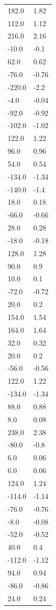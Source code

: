 \begin{longtable}{ll}
182.0 & 1.82 \\
112.0 & 1.12 \\
216.0 & 2.16 \\
-10.0 & -0.1 \\
62.0 & 0.62 \\
-76.0 & -0.76 \\
-220.0 & -2.2 \\
-4.0 & -0.04 \\
-92.0 & -0.92 \\
-102.0 & -1.02 \\
122.0 & 1.22 \\
96.0 & 0.96 \\
54.0 & 0.54 \\
-134.0 & -1.34 \\
-140.0 & -1.4 \\
18.0 & 0.18 \\
-66.0 & -0.66 \\
28.0 & 0.28 \\
-18.0 & -0.18 \\
128.0 & 1.28 \\
90.0 & 0.9 \\
10.0 & 0.1 \\
-72.0 & -0.72 \\
20.0 & 0.2 \\
154.0 & 1.54 \\
164.0 & 1.64 \\
32.0 & 0.32 \\
20.0 & 0.2 \\
-56.0 & -0.56 \\
122.0 & 1.22 \\
-134.0 & -1.34 \\
88.0 & 0.88 \\
8.0 & 0.08 \\
238.0 & 2.38 \\
-80.0 & -0.8 \\
6.0 & 0.06 \\
6.0 & 0.06 \\
124.0 & 1.24 \\
-114.0 & -1.14 \\
-76.0 & -0.76 \\
-8.0 & -0.08 \\
-52.0 & -0.52 \\
40.0 & 0.4 \\
-112.0 & -1.12 \\
94.0 & 0.94 \\
-86.0 & -0.86 \\
24.0 & 0.24 \\

\end{longtable}
